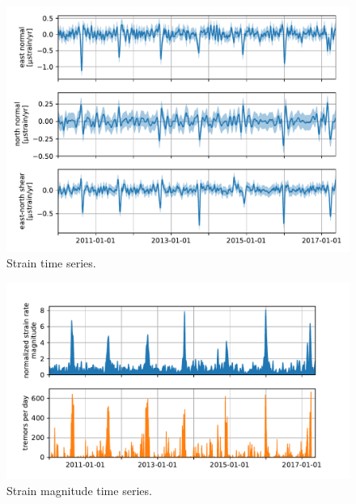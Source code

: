 \documentclass[10pt,a4paper]{article}
\begin{document}
\begin{figure}
\includegraphics{figures/strain_ts/strain-ts.pdf}
\caption{Strain time series.}   
\label{fig:StrainTs}
\end{figure}

\begin{figure}
\includegraphics{figures/strain_ts/mag-ts.pdf}
\caption{Strain magnitude time series.}   
\label{fig:StrainMag}
\end{figure}
\end{document}
